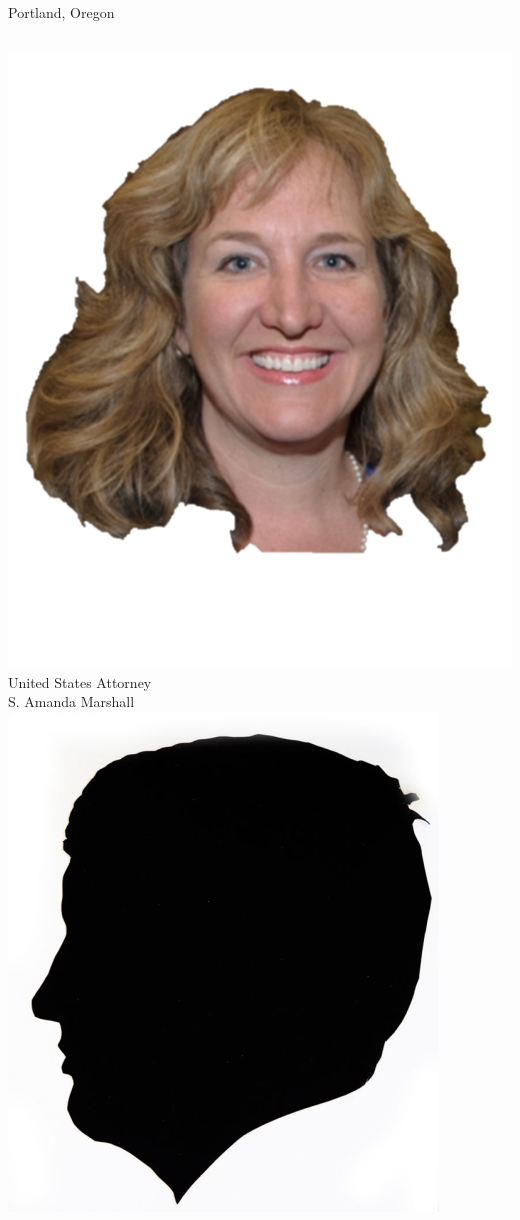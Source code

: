 \begin{frame}{Portland, Oregon}
    \begin{columns}[onlytextwidth]
            \centering
            \includegraphics[height=0.28\textheight]{img/amanda-marshall.png}
            \\ United States Attorney \\ S. Amanda Marshall \\
            \includegraphics[height=0.28\textheight]{img/elmer-dickens.png}

\end{columns}
\end{frame}
